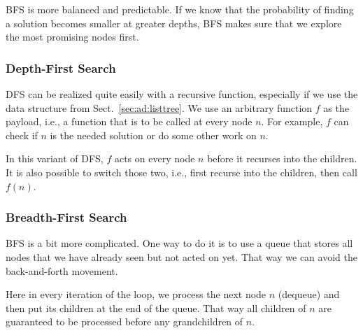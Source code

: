 BFS is more balanced and predictable.
If we know that the probability of finding a solution becomes smaller at greater depths, BFS makes sure that we explore the most promising nodes first.

\subsubsection{Depth-First Search}\label{sec:ad:dfs}

DFS can be realized quite easily with a recursive function, especially if we use the data structure from Sect.~\ref{sec:ad:listtree}.
We use an arbitrary function $f$ as the payload, i.e., a function that is to be called at every node $n$.
For example, $f$ can check if $n$ is the needed solution or do some other work on $n$.

\begin{acode}
\end{acode}

In this variant of DFS, $f$ acts on every node $n$ before it recurses into the children.
It is also possible to switch those two, i.e., first recurse into the children, then call $f(n)$.

\subsubsection{Breadth-First Search}\label{sec:ad:bfs}

BFS is a bit more complicated.
One way to do it is to use a queue that stores all nodes that we have already seen but not acted on yet.
That way we can avoid the back-and-forth movement.

\begin{acode}
\end{acode}

Here in every iteration of the loop, we process the next node $n$ (dequeue) and then put its children at the end of the queue.
That way all children of $n$ are guaranteed to be processed before any grandchildren of $n$.
\medskip

